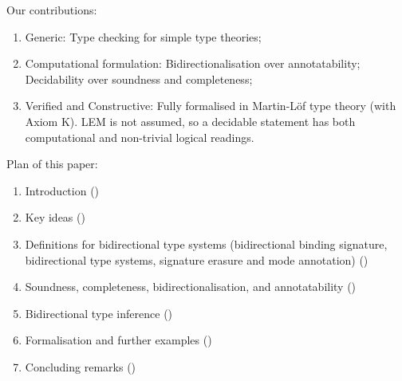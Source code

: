 Our contributions:
\begin{enumerate}
  \item Generic: Type checking for simple type theories;
  \item Computational formulation: Bidirectionalisation over annotatability; Decidability over soundness and completeness;
  \item Verified and Constructive: Fully formalised in Martin-Löf type theory (with Axiom K).
    LEM is not assumed, so a decidable statement has both computational and non-trivial logical readings.
\end{enumerate}

Plan of this paper:
\begin{enumerate}
  \item Introduction () 
  \item Key ideas ()
  \item Definitions for bidirectional type systems (bidirectional binding signature, bidirectional type systems, signature erasure and mode annotation) ()
  \item Soundness, completeness, bidirectionalisation, and annotatability ()
  \item Bidirectional type inference ()
  \item Formalisation and further examples ()
  \item Concluding remarks ()
     
\end{enumerate}




